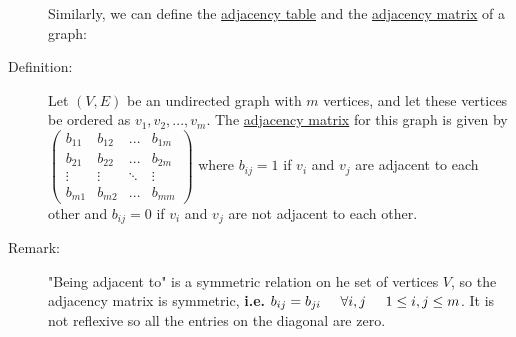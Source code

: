 \documentclass[10pt]{article}
\begin{document}
\begin{description}
			Similarly, we can define the \underline{adjacency table} and the \underline{adjacency matrix} of a graph:
			\item[Definition:] Let $(V,E)$ be an undirected graph with $m$ vertices, and let these vertices be ordered as $v_1, v_2, ..., v_m$. The \underline{adjacency matrix} for this graph is given by $\left( \begin{array}{cccc}
			b_{11} & b_{12} & ... & b_{1m} \\
			b_{21} & b_{22} & ... & b_{2m} \\
			\vdots & \vdots & \ddots & \vdots \\
			b_{m1} & b_{m2} & ... & b_{mm} \end{array} \right)$ where $b_{ij}=1$ if $v_i$ and $v_j$ are adjacent to each other and $b_{ij}=0$ if $v_i$ and $v_j$ are not adjacent to each other.
			\item[Remark:] "Being adjacent to" is a symmetric relation on he set of vertices $V$, so the adjacency matrix is symmetric, \textbf{i.e.} $b_{ij}=b_{ji} \hspace{5mm} \forall i, j \hspace{5mm} 1 \leq i, j \leq m$. It is not reflexive so all the entries on the diagonal are zero.
	\end{description}
	
\end{document}
